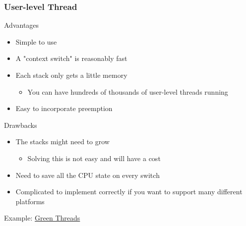 \begin{frame}[fragile]
    \frametitle{User-level Thread}
% 
% 
% 
{\color{red}Advantages}
 
     \begin{itemize}
         \item Simple to use
         \item A "context switch" is reasonably fast
         \item Each stack only gets a little memory
     	\begin{itemize}
     	    \item You can have hundreds of thousands of user-level threads running
       \end{itemize}
         \item Easy to incorporate preemption
     \end{itemize}
 
{\color{red}Drawbacks}
 
    \begin{itemize}
        \item The stacks might need to grow
    	\begin{itemize}
    	    \item Solving this is not easy and will have a cost
      \end{itemize}
        \item Need to save all the CPU state on every switch
        \item Complicated to implement correctly if you want to support many different platforms
    \end{itemize}

Example: \href{https://cfsamson.github.io/books-futures-explained/0_background_information.html#green-threads}{Green Threads}

\end{frame}
